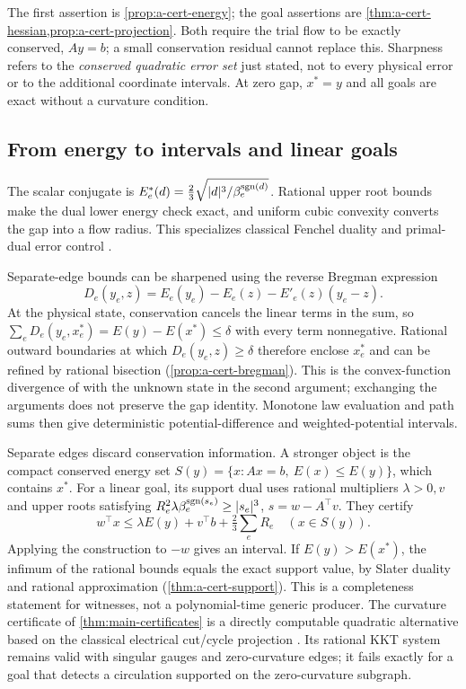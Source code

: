 The first assertion is \cref{prop:a-cert-energy}; the goal assertions
are \cref{thm:a-cert-hessian,prop:a-cert-projection}. Both require the
trial flow to be exactly conserved, $Ay=b$; a small conservation
residual cannot replace this. Sharpness refers to the \emph{conserved
quadratic error set} just stated, not to every physical error or to the
additional coordinate intervals. At zero gap, $x^*=y$ and all goals are
exact without a curvature condition.

\subsection{From energy to intervals and linear goals}

The scalar conjugate is
$E_e^*(d)=\tfrac23\sqrt{|d|^3/\beta_e^{\operatorname{sgn}(d)}}$.
Rational upper root bounds make the dual lower energy check exact, and
uniform cubic convexity converts the gap into a flow radius. This
specializes classical Fenchel duality and primal-dual error control
\citep{boyd2004-convex,bartels2020-primal-dual}.

Separate-edge bounds can be sharpened using the reverse Bregman
expression
\[
 D_e(y_e,z)=E_e(y_e)-E_e(z)-E'_e(z)(y_e-z).
\]
At the physical state, conservation cancels the linear terms in the
sum, so $\sum_eD_e(y_e,x_e^*)=E(y)-E(x^*)\le\delta$ with every term
nonnegative. Rational outward boundaries at which $D_e(y_e,z)\ge\delta$
therefore enclose $x_e^*$ and can be refined by rational bisection
(\cref{prop:a-cert-bregman}). This is the convex-function divergence of
\citet{bregman1967-relaxation} with the unknown state in the second
argument; exchanging the arguments does not preserve the gap identity.
Monotone law evaluation and path sums then give deterministic
potential-difference and weighted-potential intervals.

Separate edges discard conservation information. A stronger object is
the compact conserved energy set
$S(y)=\{x:Ax=b,\ E(x)\le E(y)\}$, which contains $x^*$.
For a linear goal, its support dual uses rational multipliers
$\lambda>0,v$ and upper roots satisfying
$R_e^2\lambda\beta_e^{\operatorname{sgn}(s_e)}\ge|s_e|^3$,
$s=w-A^\top v$. They certify
\[
 w^\top x\le \lambda E(y)+v^\top b+\tfrac23\sum_eR_e
 \quad(x\in S(y)).
\]
Applying the construction to $-w$ gives an interval. If
$E(y)>E(x^*)$, the infimum of the rational bounds equals the exact
support value, by Slater duality and rational approximation
(\cref{thm:a-cert-support}). This is a completeness statement for
witnesses, not a polynomial-time generic producer. The curvature
certificate of \cref{thm:main-certificates} is a directly computable
quadratic alternative based on the classical electrical cut/cycle
projection \citep[Chapter 2, Section 4]{lyons2016-probability}. Its
rational KKT system remains valid with singular gauges and
zero-curvature edges; it fails exactly for a goal that detects a
circulation supported on the zero-curvature subgraph.

